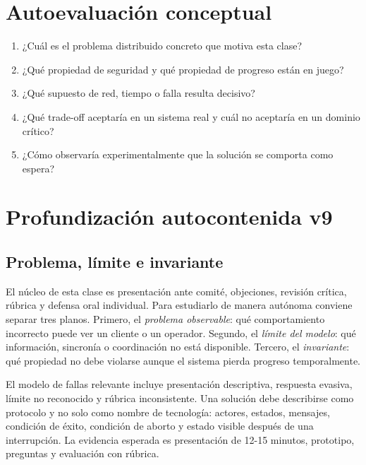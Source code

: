 \documentclass[variant=apuntes,cover=institutional,mode=screen]{ua-engineering-v6-article}
\begin{document}
\section{Autoevaluación conceptual}
\begin{enumerate}
\item ¿Cuál es el problema distribuido concreto que motiva esta clase?
\item ¿Qué propiedad de seguridad y qué propiedad de progreso están en juego?
\item ¿Qué supuesto de red, tiempo o falla resulta decisivo?
\item ¿Qué trade-off aceptaría en un sistema real y cuál no aceptaría en un dominio crítico?
\item ¿Cómo observaría experimentalmente que la solución se comporta como espera?
\end{enumerate}

\section{Profundización autocontenida v9}
\subsection{Problema, límite e invariante}
El núcleo de esta clase es presentación ante comité, objeciones, revisión crítica, rúbrica y defensa oral individual. Para estudiarlo de manera autónoma conviene separar tres planos. Primero, el \emph{problema observable}: qué comportamiento incorrecto puede ver un cliente o un operador. Segundo, el \emph{límite del modelo}: qué información, sincronía o coordinación no está disponible. Tercero, el \emph{invariante}: qué propiedad no debe violarse aunque el sistema pierda progreso temporalmente.

El modelo de fallas relevante incluye presentación descriptiva, respuesta evasiva, límite no reconocido y rúbrica inconsistente. Una solución debe describirse como protocolo y no solo como nombre de tecnología: actores, estados, mensajes, condición de éxito, condición de aborto y estado visible después de una interrupción. La evidencia esperada es presentación de 12-15 minutos, prototipo, preguntas y evaluación con rúbrica.
\end{document}
